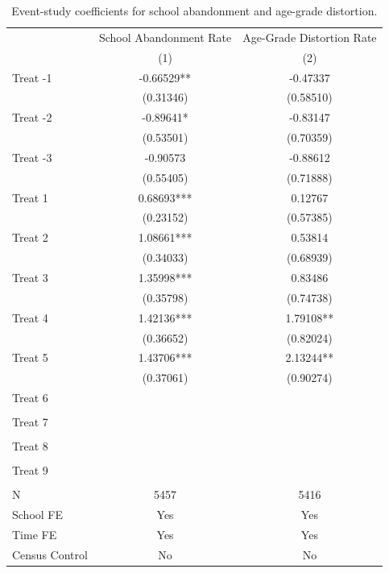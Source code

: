 \begin{table}[!htbp]
\centering
\caption{Event-study coefficients for school abandonment and age-grade distortion.}
\label{tab:event_study_performance}
\begin{tabular}{lcc}
\hline
 & \multicolumn{1}{c}{School Abandonment Rate} & \multicolumn{1}{c}{Age-Grade Distortion Rate} \\
 & (1) & (2) \\
\hline
Treat -1 & -0.66529** & -0.47337 \\
 & (0.31346) & (0.58510) \\
Treat -2 & -0.89641* & -0.83147 \\
 & (0.53501) & (0.70359) \\
Treat -3 & -0.90573 & -0.88612 \\
 & (0.55405) & (0.71888) \\
Treat 1 &  0.68693*** &  0.12767 \\
 & (0.23152) & (0.57385) \\
Treat 2 &  1.08661*** &  0.53814 \\
 & (0.34033) & (0.68939) \\
Treat 3 &  1.35998*** &  0.83486 \\
 & (0.35798) & (0.74738) \\
Treat 4 &  1.42136*** &  1.79108** \\
 & (0.36652) & (0.82024) \\
Treat 5 &  1.43706*** &  2.13244** \\
 & (0.37061) & (0.90274) \\
Treat 6 &  &  \\
 &  &  \\
Treat 7 &  &  \\
 &  &  \\
Treat 8 &  &  \\
 &  &  \\
Treat 9 &  &  \\
 &  &  \\
N & 5457 & 5416 \\
School FE & Yes & Yes \\
Time FE & Yes & Yes \\
Census Control & No & No \\
\hline
\end{tabular}
\end{table}
